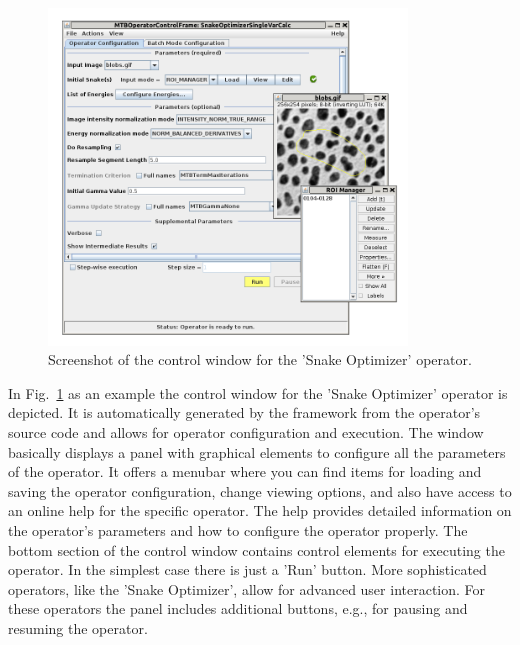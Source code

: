 \begin{center}
\begin{figure}[t]
\begin{center}
\includegraphics[width=0.85\textwidth]{../images/ScreenshotSnakeOp_trans.png}
\caption{\label{fig:snakeop}Screenshot of the control window for the 'Snake Optimizer' operator.}
\end{center}
\end{figure}
\end{center}

In Fig.~\ref{fig:snakeop} as an example the control window for the 'Snake Optimizer' operator is depicted.
It is automatically generated by the framework from the operator's source code and allows for 
operator configuration and execution. The window basically displays a panel with graphical
elements to configure all the parameters of the operator. It offers a menubar where you can 
find items for loading and saving the operator configuration, change viewing options, and also have
access to an online help for the specific operator. The help provides detailed information on the 
operator's parameters and how to configure the operator properly. The bottom section of the control
window contains control elements for executing the operator. In the simplest case there is just
a 'Run' button. More sophisticated operators, like the 'Snake Optimizer', allow for advanced user interaction.
For these operators the panel includes additional buttons, e.g., for pausing and resuming the operator. 
